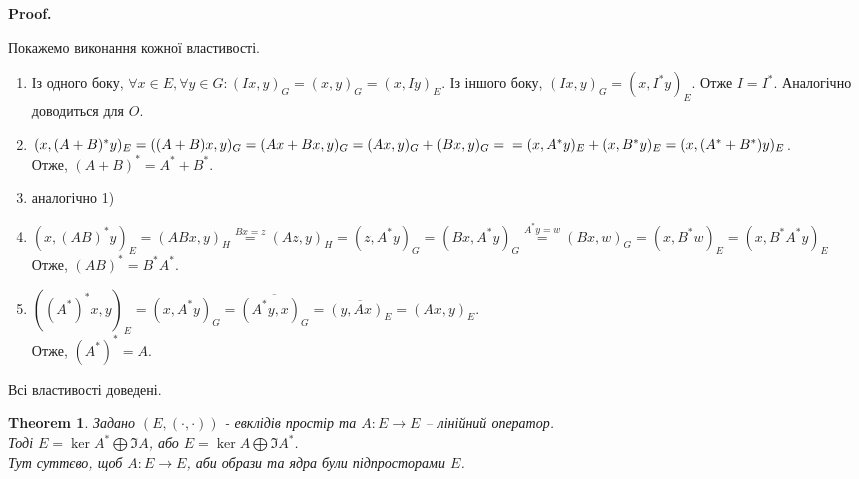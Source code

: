 \documentclass[a4paper, 10pt]{article}
\makeatletter
\theoremstyle{theoremdd}
\newtheorem{theorem}{Theorem}[subsection]
\renewenvironment{proof}[1][Proof.\\]{\par
\pushQED{\hfill \qed}%
\normalfont \topsep6\p@\@plus6\p@\relax
\trivlist
\item\relax
{\bfseries
#1\@addpunct{.}}\hspace\labelsep\ignorespaces
}{%
\popQED\endtrivlist\@endpefalse
}
\makeatother
\begin{document}
\begin{proof}
Покажемо виконання кожної властивості.
\begin{enumerate}[topsep=-\parskip, wide=0pt, label={\arabic*)}, start=0]
\item Із одного боку, $\forall x \in E, \forall y \in G: (Ix,y)_G = (x,y)_G = (x, Iy)_E$. Із іншого боку, $(Ix,y)_G = (x,I^*y)_E$. Отже $I = I^*$. Аналогічно доводиться для $O$.
\item $(x,(A+B)^*y)_E = ((A+B)x,y)_G = (Ax+Bx,y)_G = (Ax,y)_G + (Bx, y)_G = \\ = (x,A^* y)_E+(x,B^* y)_E = (x,(A^*+B^*)y)_E$.\\
Отже, $(A+B)^* = A^* + B^*$.
\item аналогічно 1)
\item $(x,(AB)^*y)_E = (ABx, y)_H \overset{Bx = z}{=} (Az,y)_H = (z, A^*y)_G = (Bx, A^*y)_G \overset{A^* y = w}{=} (Bx,w)_G = (x, B^* w)_E = (x, B^* A^* y)_E$\\
Отже, $(AB)^* = B^* A^*$.
\iffalse \item $(x,Ay) = \overline{(Ay, x)} = \overline{(y, A^*x)} = (A^*x, y)$. \fi
\item $((A^*)^*x,y)_E = (x,A^*y)_G = \overline{(A^*y,x)_G} = \overline{(y,Ax)_E} = (Ax,y)_E$.\\
Отже, $(A^*)^* = A$.
\end{enumerate}
Всі властивості доведені.
\end{proof}

\begin{theorem}
\label{euclid_decomposition}
Задано $(E,(\cdot,\cdot))$ - евклідів простір та $A: E \to E$ -- лінійний оператор.\\
Тоді $E = \ker A^* \bigoplus \Im A$, \hspace{2cm} або $E = \ker A \bigoplus \Im A^*$.\\
\textit{Тут суттєво, щоб $A \colon E \to E$, аби образи та ядра були підпросторами $E$.}
\end{theorem}
\end{document}
